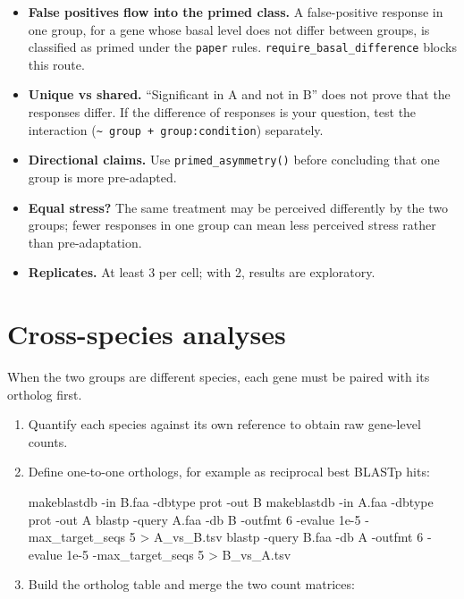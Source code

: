 \documentclass[11pt,a4paper]{article}
\newcommand{\code}[1]{\texttt{\color{navy!85!black}#1}}
\begin{document}
\begin{itemize}
  \item \textbf{False positives flow into the primed class.} A false-positive response in one group, for a gene
        whose basal level does not differ between groups, is classified as primed under the
        \code{paper} rules. \code{require\_basal\_difference} blocks this route.
  \item \textbf{Unique vs shared.} ``Significant in A and not in B'' does not prove that the responses
        differ. If the difference of responses is your question, test the interaction
        (\code{\textasciitilde{} group + group:condition}) separately.
  \item \textbf{Directional claims.} Use \code{primed\_asymmetry()} before concluding that one group is
        more pre-adapted.
  \item \textbf{Equal stress?} The same treatment may be perceived differently by the two groups; fewer
        responses in one group can mean less perceived stress rather than pre-adaptation.
  \item \textbf{Replicates.} At least 3 per cell; with 2, results are exploratory.
\end{itemize}

\section{Cross-species analyses}

When the two groups are different species, each gene must be paired with its ortholog first.

\begin{enumerate}
  \item Quantify each species against its own reference to obtain raw gene-level counts.
  \item Define one-to-one orthologs, for example as reciprocal best BLASTp hits:
\begin{shcode}
makeblastdb -in B.faa -dbtype prot -out B
makeblastdb -in A.faa -dbtype prot -out A
blastp -query A.faa -db B -outfmt 6 -evalue 1e-5 -max_target_seqs 5 > A_vs_B.tsv
blastp -query B.faa -db A -outfmt 6 -evalue 1e-5 -max_target_seqs 5 > B_vs_A.tsv
\end{shcode}
  \item Build the ortholog table and merge the two count matrices:
\end{enumerate}
\end{document}
